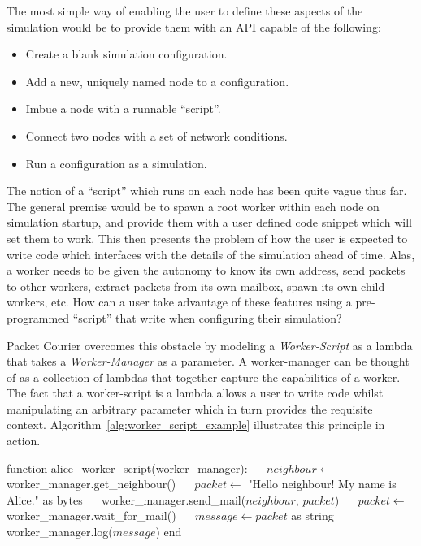 The most simple way of enabling the user to define these aspects of the simulation would be to provide them with an
API capable of the following:
\begin{itemize}
    \item Create a blank simulation configuration.
    \item Add a new, uniquely named node to a configuration.
    \item Imbue a node with a runnable ``script''.
    \item Connect two nodes with a set of network conditions.
    \item Run a configuration as a simulation.
\end{itemize}

The notion of a ``script'' which runs on each node has been quite vague thus far. The general premise would be to
spawn a root worker within each node on simulation startup, and provide them with a user defined code snippet which
will set them to work. This then presents the problem of how the user is expected to write code which interfaces with
the details of the simulation ahead of time. Alas, a worker needs to be given the autonomy to know its own address,
send packets to other workers, extract packets from its own mailbox, spawn its own child workers, etc. How can a user
take advantage of these features using a pre-programmed ``script'' that write when configuring their simulation?

Packet Courier overcomes this obstacle by modeling a \emph{Worker-Script} as a lambda that takes a
\emph{Worker-Manager} as a parameter. A worker-manager can be thought of as a collection of lambdas that together
capture the capabilities of a worker. The fact that a worker-script is a lambda allows a user to write code whilst
manipulating an arbitrary parameter which in turn provides the requisite context.
Algorithm~\ref{alg:worker_script_example} illustrates this principle in action. \\

\begin{algorithm}[caption={An example of what a worker-script might look like.},label={alg:worker_script_example},
    captionpos=b]
    function alice_worker_script(worker_manager):
    $\quad$ $neighbour \gets$ worker_manager.get_neighbour()
    $\quad$ $packet \gets$ "Hello neighbour! My name is Alice." as bytes
    $\quad$ worker_manager.send_mail($neighbour$, $packet$)
    $\quad$ $packet \gets$ worker_manager.wait_for_mail()
    $\quad$ $message \gets packet$ as string
    $\quad$ worker_manager.log($message$)
    end
\end{algorithm}

